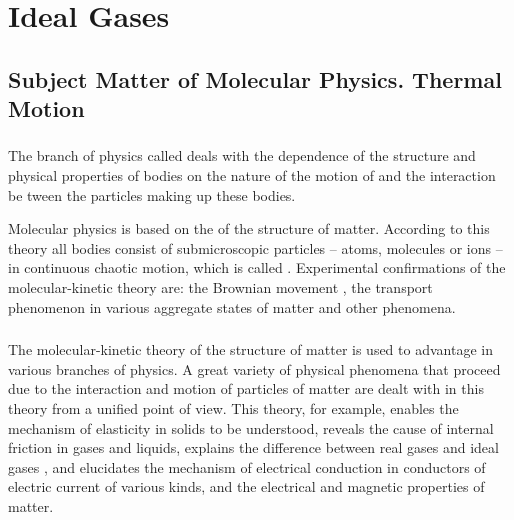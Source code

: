 
\chapter{Ideal Gases}
\label{ch-08}

\section{Subject Matter of Molecular Physics. Thermal Motion}
\label{sec-8.1}
\subsection{}\label{8.1.1} The branch of physics called  deals with the dependence of the structure and physical properties of bodies on the nature of the motion of and the interaction be­ tween the particles making up these bodies.

Molecular physics is based on the  of the structure of matter. According to this theory all bodies consist of submicroscopic particles -- atoms, molecules or ions -- in continuous chaotic motion, which is called . Experimental confirmations of the molecular-kinetic theory are: the Brownian movement , the transport phenomenon in various aggregate states of matter and other phenomena. 

\subsection{}\label{8.1.2} The molecular-kinetic theory of the structure of matter is used to advantage in various branches of physics. A great variety of physical phenomena that proceed due to the interac­tion and motion of particles of matter are dealt with in this theory from a unified point of view. This theory, for example, enables the mechanism of elasticity in solids  to be understood, reveals the cause of internal friction in gases  and liquids, explains the difference between real gases  and ideal gases , and elucidates the mechanism of elec­trical conduction in conductors of electric current of various kinds, and the electrical and magnetic properties of matter.

